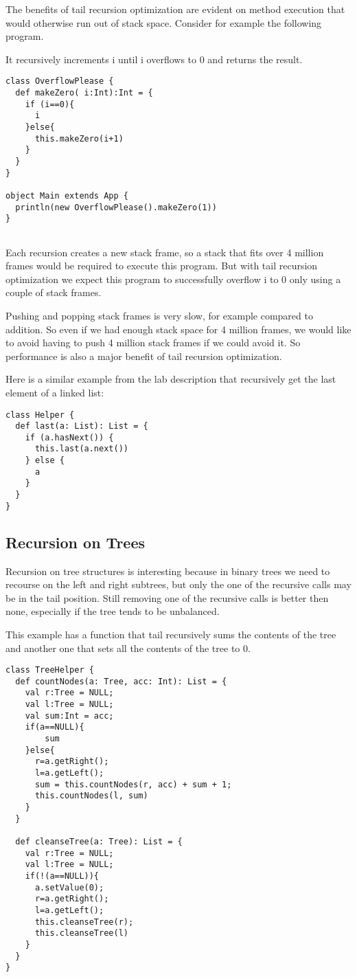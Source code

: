 The benefits of tail recursion optimization are evident on  method execution that would otherwise run out of stack space. Consider for example the following program.

It recursively increments i until i overflows to 0 and returns the result.
\begin{lstlisting}
class OverflowPlease {
  def makeZero( i:Int):Int = {
    if (i==0){
      i
    }else{
      this.makeZero(i+1)
    }
  }
}

object Main extends App {
  println(new OverflowPlease().makeZero(1))
}


\end{lstlisting}

Each recursion creates a new stack frame, so a stack that fits over 4 million frames would be required to execute this program. But with tail recursion optimization we expect this program to successfully overflow i to 0 only using a couple of stack frames.

Pushing and popping stack frames is very slow, for example compared to addition. So even if we had enough stack space for 4 million frames, we would like to avoid having to push 4 million stack frames if we could avoid it. So performance is also a major benefit of tail recursion optimization.


Here is a similar example from the lab description that recursively get the last element of a linked list:

\begin{lstlisting}
class Helper {
  def last(a: List): List = {
    if (a.hasNext()) {
      this.last(a.next())
    } else {
      a
    }
  }
}
\end{lstlisting}

\subsection{Recursion on Trees}

Recursion on tree structures is interesting because in binary trees we need to recourse on the left and right subtrees, but only the one of the recursive calls may be in the tail position. Still removing one of the recursive calls is better then none, especially if the tree tends to be unbalanced.

This example has a function that tail recursively sums the contents of the tree and another one that sets all the contents of the tree to 0.

\begin{lstlisting}
class TreeHelper {
  def countNodes(a: Tree, acc: Int): List = {
    val r:Tree = NULL;
    val l:Tree = NULL;
    val sum:Int = acc;
    if(a==NULL){
        sum
    }else{
      r=a.getRight();
      l=a.getLeft();
      sum = this.countNodes(r, acc) + sum + 1;
      this.countNodes(l, sum)
    }
  }
  
  def cleanseTree(a: Tree): List = {
    val r:Tree = NULL;
    val l:Tree = NULL;
    if(!(a==NULL)){
      a.setValue(0);
      r=a.getRight();
      l=a.getLeft();
      this.cleanseTree(r);
      this.cleanseTree(l)
    }
  }
}
\end{lstlisting}

